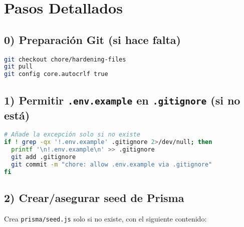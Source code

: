 \documentclass[11pt]{article}
\begin{document}
\section*{Pasos Detallados}

\subsection*{0) Preparación Git (si hace falta)}
\begin{lstlisting}[language=bash]
git checkout chore/hardening-files
git pull
git config core.autocrlf true
\end{lstlisting}

\subsection*{1) Permitir \texttt{.env.example} en \texttt{.gitignore} (si no está)}
\begin{lstlisting}[language=bash]
# Añade la excepción solo si no existe
if ! grep -qx '!.env.example' .gitignore 2>/dev/null; then
  printf '\n!.env.example\n' >> .gitignore
  git add .gitignore
  git commit -m "chore: allow .env.example via .gitignore"
fi
\end{lstlisting}

\subsection*{2) Crear/asegurar seed de Prisma}
Crea \texttt{prisma/seed.js} solo si no existe, con el siguiente contenido:
\end{document}
